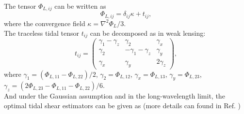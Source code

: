 The tensor $\Phi_{L,ij}$ can be written as 
\begin{equation}
\Phi_{L,ij}= \delta_{ij}\kappa +t_{ij},
\end{equation}
where the convergence field $\kappa = \nabla^{2}\Phi_{L}/3$.\\
The traceless tidal tensor $t_{ij}$ can be decomposed as in weak lensing:
\begin{equation}
t_{ij}=
\begin{pmatrix}
\gamma_{1}-\gamma_{z} & \gamma_{2} & \gamma_{x} \\
\gamma_{2} & -\gamma_{1}-\gamma_{z} & \gamma_{y} \\
\gamma_{x} & \gamma_{y} & 2\gamma_{z}
\end{pmatrix},
\label{tij_c5}
\end{equation}
where
$\gamma_{1}=(\Phi_{L,11}-\Phi_{L,22})/2$,
$\gamma_{2}=\Phi_{L,12}$,
$\gamma_{x}=\Phi_{L,13}$,
$\gamma_{y}=\Phi_{L,23}$,
$\gamma_{z}=(2\Phi_{L,23}-\Phi_{L,11}-\Phi_{L,22})/6$.\\

And under the Gaussian assumption and in the long-wavelength limit,
the optimal tidal shear estimators can be given as
(more details can found in Ref. \citep{2016PhRvD..93j3504Z})
%

